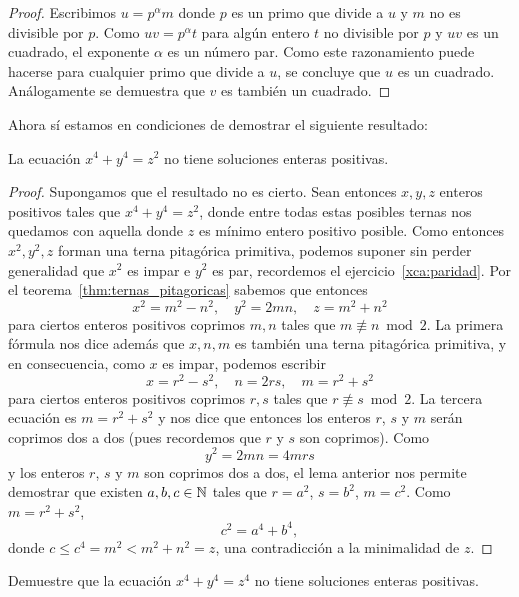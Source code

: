 \begin{proof}
	Escribimos $u=p^{\alpha}m$ donde $p$ es un primo que divide a $u$ y $m$ no
	es divisible por $p$. Como $uv=p^{\alpha}t$ para algún entero $t$ no
	divisible por $p$ y $uv$ es un cuadrado, el exponente $\alpha$ es un número
	par. Como este razonamiento puede hacerse para cualquier primo que divide a
	$u$, se concluye que $u$ es un cuadrado. Análogamente se demuestra que $v$
	es también un cuadrado. 
\end{proof}

Ahora sí estamos en condiciones de demostrar el siguiente resultado:

\begin{theorem}
	La ecuación $x^4+y^4=z^2$ no tiene soluciones enteras positivas.
\end{theorem}

\begin{proof}
	Supongamos que el resultado no es cierto. Sean entonces	$x,y,z$ enteros
	positivos tales que $x^4+y^4=z^2$, donde entre todas estas posibles ternas
	nos quedamos con aquella donde $z$ es mínimo entero positivo posible. Como
	entonces $x^2,y^2,z$ forman una terna pitagórica primitiva, podemos suponer
	sin perder generalidad que $x^2$ es impar e $y^2$ es par, recordemos el
	ejercicio~\ref{xca:paridad}. Por el teorema~\ref{thm:ternas_pitagoricas}
	sabemos que entonces
	\[
		x^2=m^2-n^2,\quad
		y^2=2mn,\quad
		z=m^2+n^2
	\]
	para ciertos enteros positivos coprimos $m,n$ tales que $m\not\equiv n\bmod
	2$. La primera fórmula nos dice además que $x,n,m$ es también una terna
	pitagórica primitiva, y en consecuencia, como $x$ es impar, podemos
	escribir
	\[
		x=r^2-s^2,\quad
		n=2rs,\quad
		m=r^2+s^2
	\]
	para ciertos enteros positivos coprimos $r,s$ tales que $r\not\equiv s\bmod
	2$. La tercera ecuación es $m=r^2+s^2$ y nos dice que entonces los enteros
	$r$, $s$ y $m$ serán coprimos dos a dos (pues recordemos que $r$ y $s$ son
	coprimos). Como
	\[
		y^2=2mn=4mrs
	\]
	y los enteros $r$, $s$ y $m$ son coprimos dos a dos, el lema anterior nos
	permite demostrar que existen $a,b,c\in\mathbb{N}$ tales que $r=a^2$, $s=b^2$,
	$m=c^2$. Como $m=r^2+s^2$, 
	\[
		c^2=a^4+b^4,
	\]
	donde $c\leq c^4=m^2< m^2+n^2=z$, una contradicción a la minimalidad de
	$z$.
\end{proof}

\begin{exercise}
	Demuestre que la ecuación $x^4+y^4=z^4$ no tiene soluciones enteras
	positivas.
\end{exercise}

